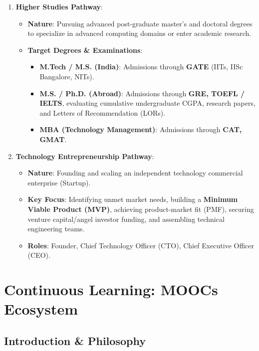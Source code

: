 \begin{enumerate}[leftmargin=1.5em]
    \item \textbf{Higher Studies Pathway}:
    \begin{itemize}
        \item \textbf{Nature}: Pursuing advanced post-graduate master's and doctoral degrees to specialize in advanced computing domains or enter academic research.
        \item \textbf{Target Degrees \& Examinations}:
        \begin{itemize}
            \item \textbf{M.Tech / M.S. (India)}: Admissions through \textbf{GATE} (IITs, IISc Bangalore, NITs).
            \item \textbf{M.S. / Ph.D. (Abroad)}: Admissions through \textbf{GRE, TOEFL / IELTS}, evaluating cumulative undergraduate CGPA, research papers, and Letters of Recommendation (LORs).
            \item \textbf{MBA (Technology Management)}: Admissions through \textbf{CAT, GMAT}.
        \end{itemize}
    \end{itemize}

    \item \textbf{Technology Entrepreneurship Pathway}:
    \begin{itemize}
        \item \textbf{Nature}: Founding and scaling an independent technology commercial enterprise (Startup).
        \item \textbf{Key Focus}: Identifying unmet market needs, building a \textbf{Minimum Viable Product (MVP)}, achieving product-market fit (PMF), securing venture capital/angel investor funding, and assembling technical engineering teams.
        \item \textbf{Roles}: Founder, Chief Technology Officer (CTO), Chief Executive Officer (CEO).
    \end{itemize}
\end{enumerate}

\section{Continuous Learning: MOOCs Ecosystem}

\subsection{Introduction \& Philosophy}

